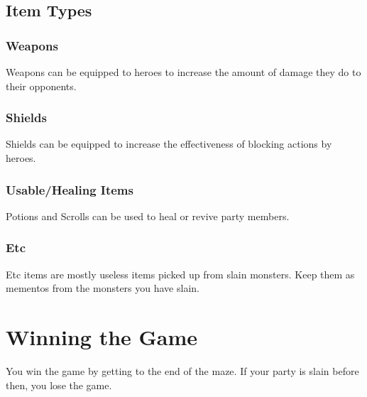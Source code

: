 \documentclass{article}
\begin{document}
\subsection{Item Types}
\subsubsection{Weapons}
Weapons can be equipped to heroes to increase the amount of damage they do to their opponents.

\subsubsection{Shields}
Shields can be equipped to increase the effectiveness of blocking actions by heroes.

\subsubsection{Usable/Healing Items}
Potions and Scrolls can be used to heal or revive party members.

\subsubsection{Etc}
Etc items are mostly useless items picked up from slain monsters. Keep them as mementos from the monsters you have slain.

\section{Winning the Game}
You win the game by getting to the end of the maze. If your party is slain before then, you lose the game.
\end{document}
